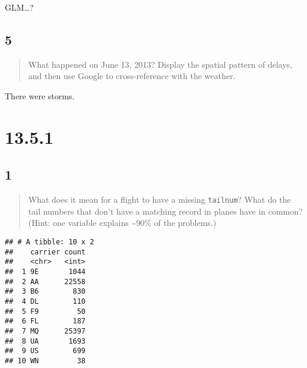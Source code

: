 \documentclass[]{ltjsarticle}
\newenvironment{Shaded}{\begin{snugshade}}{\end{snugshade}}
\newcommand{\DataTypeTok}[1]{\textcolor[rgb]{0.13,0.29,0.53}{#1}}
\newcommand{\KeywordTok}[1]{\textcolor[rgb]{0.13,0.29,0.53}{\textbf{#1}}}
\newcommand{\NormalTok}[1]{#1}
\newcommand{\OperatorTok}[1]{\textcolor[rgb]{0.81,0.36,0.00}{\textbf{#1}}}
\newcommand{\StringTok}[1]{\textcolor[rgb]{0.31,0.60,0.02}{#1}}
\begin{document}
GLM\ldots?

\hypertarget{section-16}{%
\subsection{5}\label{section-16}}

\begin{quote}
What happened on June 13, 2013? Display the spatial pattern of delays,
and then use Google to cross-reference with the weather.
\end{quote}

There were storms.

\hypertarget{section-17}{%
\section{13.5.1}\label{section-17}}

\hypertarget{section-18}{%
\subsection{1}\label{section-18}}

\begin{quote}
What does it mean for a flight to have a missing \texttt{tailnum}? What
do the tail numbers that don't have a matching record in planes have in
common? (Hint: one variable explains \textasciitilde90\% of the
problems.)
\end{quote}

\begin{Shaded}
\end{Shaded}

\begin{verbatim}
## # A tibble: 10 x 2
##    carrier count
##    <chr>   <int>
##  1 9E       1044
##  2 AA      22558
##  3 B6        830
##  4 DL        110
##  5 F9         50
##  6 FL        187
##  7 MQ      25397
##  8 UA       1693
##  9 US        699
## 10 WN         38
\end{verbatim}
\end{document}
